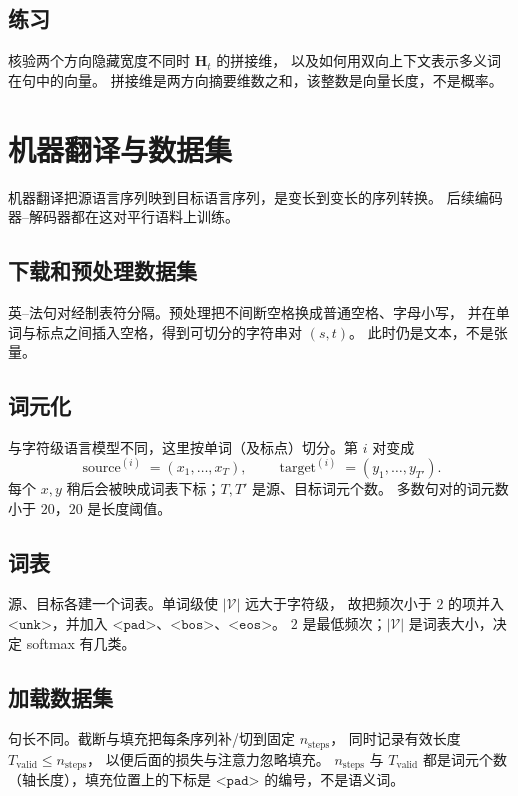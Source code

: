 \subsection{练习}

核验两个方向隐藏宽度不同时 $\bm{H}_t$ 的拼接维，
以及如何用双向上下文表示多义词在句中的向量。
拼接维是两方向摘要维数之和，该整数是向量长度，不是概率。

\section{机器翻译与数据集}

机器翻译把源语言序列映到目标语言序列，是变长到变长的序列转换。
后续编码器--解码器都在这对平行语料上训练。

\subsection{下载和预处理数据集}

英--法句对经制表符分隔。预处理把不间断空格换成普通空格、字母小写，
并在单词与标点之间插入空格，得到可切分的字符串对 $(s,t)$。
此时仍是文本，不是张量。

\subsection{词元化}

与字符级语言模型不同，这里按单词（及标点）切分。第 $i$ 对变成
\[
\operatorname{source}^{(i)}=(x_1,\ldots,x_{T}),
\qquad
\operatorname{target}^{(i)}=(y_1,\ldots,y_{T'}).
\]
每个 $x,y$ 稍后会被映成词表下标；$T,T'$ 是源、目标词元个数。
多数句对的词元数小于 $20$，$20$ 是长度阈值。

\subsection{词表}

源、目标各建一个词表。单词级使 $|\mathcal{V}|$ 远大于字符级，
故把频次小于 $2$ 的项并入 $\texttt{<unk>}$，并加入
$\texttt{<pad>}$、$\texttt{<bos>}$、$\texttt{<eos>}$。
$2$ 是最低频次；$|\mathcal{V}|$ 是词表大小，决定 softmax 有几类。

\subsection{加载数据集}

句长不同。截断与填充把每条序列补/切到固定 $n_{\text{steps}}$，
同时记录有效长度 $T_{\text{valid}}\le n_{\text{steps}}$，
以便后面的损失与注意力忽略填充。
$n_{\text{steps}}$ 与 $T_{\text{valid}}$ 都是词元个数（轴长度），填充位置上的下标是 $\texttt{<pad>}$ 的编号，不是语义词。

